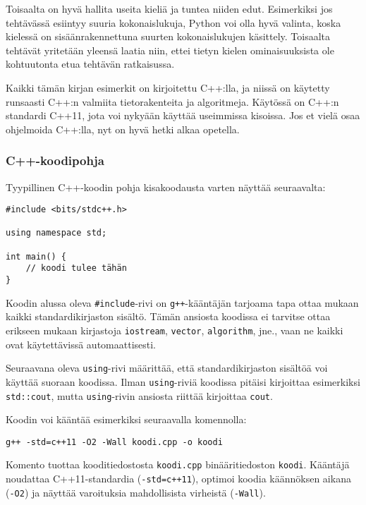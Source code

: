 Toisaalta on hyvä hallita useita kieliä
ja tuntea niiden edut.
Esimerkiksi jos tehtävässä esiintyy
suuria kokonaislukuja,
Python voi olla hyvä valinta,
koska kielessä on sisäänrakennettuna
suurten kokonaislukujen käsittely.
Toisaalta tehtävät yritetään yleensä laatia niin,
ettei tietyn kielen ominaisuuksista
ole kohtuutonta etua tehtävän ratkaisussa.

Kaikki tämän kirjan esimerkit on kirjoitettu C++:lla,
ja niissä on käytetty runsaasti C++:n valmiita 
tietorakenteita ja algoritmeja.
Käytössä on C++:n standardi C++11,
jota voi nykyään käyttää useimmissa kisoissa.
Jos et vielä osaa ohjelmoida C++:lla,
nyt on hyvä hetki alkaa opetella.

\subsubsection{C++-koodipohja}

Tyypillinen C++-koodin pohja kisakoodausta varten
näyttää seuraavalta:

\begin{lstlisting}
#include <bits/stdc++.h>

using namespace std;

int main() {
    // koodi tulee tähän
}
\end{lstlisting}

Koodin alussa oleva \texttt{\#include}-rivi
on \texttt{g++}-kääntäjän tarjoama tapa
ottaa mukaan kaikki standardikirjaston sisältö.
Tämän ansiosta koodissa ei tarvitse ottaa
erikseen mukaan kirjastoja \texttt{iostream},
\texttt{vector}, \texttt{algorithm}, jne.,
vaan ne kaikki ovat käytettävissä automaattisesti.

Seuraavana oleva \texttt{using}-rivi määrittää,
että standardikirjaston sisältöä voi käyttää
suoraan koodissa.
Ilman \texttt{using}-riviä koodissa pitäisi
kirjoittaa esimerkiksi \texttt{std::cout},
mutta \texttt{using}-rivin ansiosta riittää
kirjoittaa \texttt{cout}.

Koodin voi kääntää esimerkiksi
seuraavalla komennolla:

\begin{lstlisting}
g++ -std=c++11 -O2 -Wall koodi.cpp -o koodi
\end{lstlisting}

Komento tuottaa kooditiedostosta \texttt{koodi.cpp}
binääritiedoston \texttt{koodi}.
Kääntäjä noudattaa C++11-standardia
(\texttt{-std=c++11}),
optimoi koodia käännöksen aikana (\texttt{-O2})
ja näyttää varoituksia
mahdollisista virheistä (\texttt{-Wall}).

